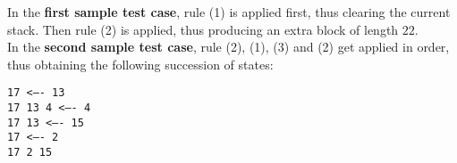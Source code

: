

\Examples
\begin{example}
%
%
\end{example}


\Explanation
In the \textbf{first sample test case}, rule (1) is applied first, thus clearing the current stack. Then rule (2) is applied, thus producing an extra block of length $22$.\\[2mm]
In the \textbf{second sample test case}, rule (2), (1), (3) and (2) get applied in order, thus obtaining the following succession of states:
\begin{center}
\texttt{17 <---- 13\\
17 13 4 <---- 4\\
17 13  <---- 15\\
17 <---- 2\\
17 2 15
}
\end{center}
